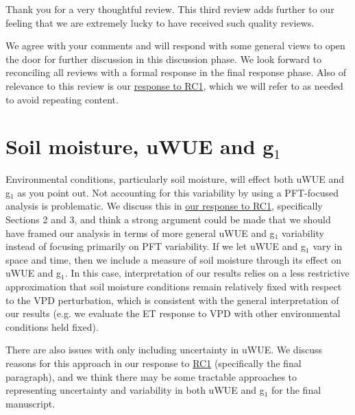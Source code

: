 \documentclass[12pt]{article}
\begin{document}
Thank you for a very thoughtful review. This third review adds further
to our feeling that we are extremely lucky to have received such
quality reviews.

We agree with your comments and will respond with some general views
to open the door for further discussion in this discussion phase. We
look forward to reconciling all reviews with a
formal response in the final response phase. Also of relevance to this
review is our \href{https://editor.copernicus.org/index.php/hess-2018-553-AC1.pdf?_mdl=msover_md&_jrl=13&_lcm=oc108lcm109w&_acm=get_comm_file&_ms=72556&c=153745&salt=17166479111051651323}{
  response to RC1}, which we will refer to as needed to avoid
repeating content.

\section{Soil moisture, uWUE and g$_1$}
Environmental conditions, particularly soil moisture, will effect both
uWUE and g$_1$ as you point out. Not accounting for this variability
by using a PFT-focused analysis is problematic. We discuss this in
\href{https://editor.copernicus.org/index.php/hess-2018-553-AC1.pdf?_mdl=msover_md&_jrl=13&_lcm=oc108lcm109w&_acm=get_comm_file&_ms=72556&c=153745&salt=17166479111051651323}{our
  response to RC1}, specifically Sections 2 and 3, and think a strong
argument could be made that we should have framed our analysis in
terms of more general uWUE and g$_1$ variability instead of focusing
primarily on PFT variability. If we let uWUE and g$_1$ vary in space
and time, then we include a measure of soil moisture through its
effect on uWUE and g$_1$. In this case, interpretation of our results
relies on a less restrictive approximation that soil moisture
conditions remain relatively fixed with respect to the VPD
perturbation, which is consistent with the general interpretation of
our results (e.g. we evaluate the ET response to VPD with
other environmental conditions held fixed).

There are also issues with only including uncertainty in uWUE. We
discuss reasons for this approach in our response to
\href{https://editor.copernicus.org/index.php/hess-2018-553-AC1.pdf?_mdl=msover_md&_jrl=13&_lcm=oc108lcm109w&_acm=get_comm_file&_ms=72556&c=153745&salt=17166479111051651323}{RC1}
(specifically the final paragraph), and we think there may be some
tractable approaches to representing uncertainty and variability in
both uWUE and g$_1$ for the final manuscript.
\end{document}
